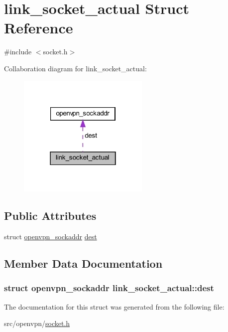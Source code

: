 \hypertarget{structlink__socket__actual}{}\section{link\+\_\+socket\+\_\+actual Struct Reference}
\label{structlink__socket__actual}


{\ttfamily \#include $<$socket.\+h$>$}



Collaboration diagram for link\+\_\+socket\+\_\+actual\+:
\nopagebreak
\begin{figure}[H]
\begin{center}
\leavevmode
\includegraphics[width=178pt]{structlink__socket__actual__coll__graph}
\end{center}
\end{figure}
\subsection*{Public Attributes}
\begin{DoxyCompactItemize}
\item 
struct \hyperlink{structopenvpn__sockaddr}{openvpn\+\_\+sockaddr} \hyperlink{structlink__socket__actual_abf5bf8e6a58e0af01a0ca0675e2a2a5c}{dest}
\end{DoxyCompactItemize}


\subsection{Member Data Documentation}
\hypertarget{structlink__socket__actual_abf5bf8e6a58e0af01a0ca0675e2a2a5c}{}
\subsubsection[{dest}]{\setlength{\rightskip}{0pt plus 5cm}struct {\bf openvpn\+\_\+sockaddr} link\+\_\+socket\+\_\+actual\+::dest}\label{structlink__socket__actual_abf5bf8e6a58e0af01a0ca0675e2a2a5c}


The documentation for this struct was generated from the following file\+:\begin{DoxyCompactItemize}
\item 
src/openvpn/\hyperlink{socket_8h}{socket.\+h}\end{DoxyCompactItemize}
